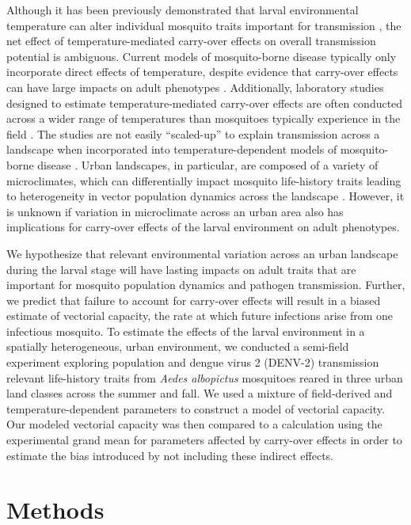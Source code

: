 \documentclass[12pt]{article}
\begin{document}
Although it has been previously demonstrated that larval environmental temperature can alter individual mosquito traits important for transmission \cite{alto2013,buckner2016}, the net effect of temperature-mediated carry-over effects on overall transmission potential is ambiguous.
Current models of mosquito-borne disease typically only incorporate direct effects of temperature, despite evidence that carry-over effects can have large impacts on adult phenotypes \cite{muturi2011c, muturi2011a, price2015}.
Additionally, laboratory studies designed to estimate temperature-mediated carry-over effects are often conducted across a wider range of temperatures than mosquitoes typically experience in the field \cite{cator2013}.
The studies are not easily ``scaled-up'' to explain transmission across a landscape when incorporated into temperature-dependent models of mosquito-borne disease \cite{reiner2013}.
Urban landscapes, in particular, are composed of a variety of microclimates, which can differentially impact mosquito life-history traits leading to heterogeneity in vector population dynamics across the landscape \cite{murdock2017}.
However, it is unknown if  variation in microclimate across an urban area also has implications for carry-over effects of the larval environment on adult phenotypes.

We hypothesize that relevant environmental variation across an urban landscape during the larval stage will have lasting impacts on adult traits that are important for mosquito population dynamics and pathogen transmission.
Further, we predict that failure to account for carry-over effects will result in a biased estimate of vectorial capacity, the rate at which future infections arise from one infectious mosquito.
To estimate the effects of the larval environment in a spatially heterogeneous, urban environment, we conducted a semi-field experiment exploring population and dengue virus 2 (DENV-2) transmission relevant life-history traits from \textit{Aedes albopictus} mosquitoes reared in three urban land classes across the summer and fall.
We used a mixture of field-derived and temperature-dependent parameters to construct a model of vectorial capacity.
Our modeled vectorial capacity was then compared to a calculation using the experimental grand mean for parameters affected by carry-over effects in order to estimate the bias introduced by not including these indirect effects.

\section*{Methods}
\end{document}
